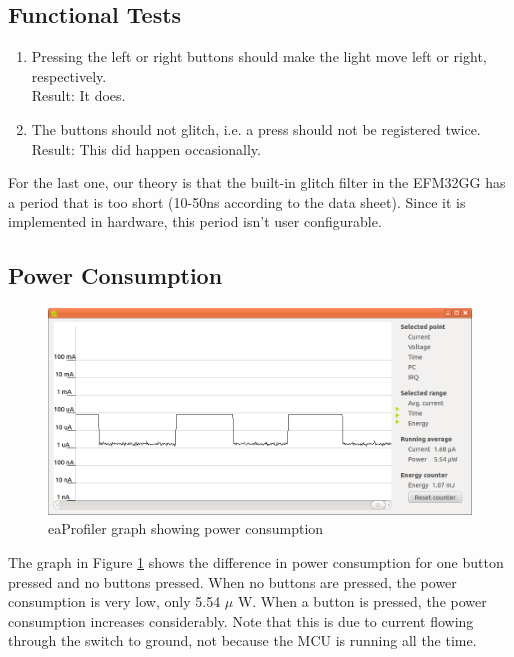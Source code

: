 \documentclass[a4paper, 12pt]{article}
\begin{document}
	\subsection{Functional Tests} %
	\label{sub:functional_tests}
		\begin{enumerate}
			\item Pressing the left or right buttons should make the light move left or right, respectively. \\
				  Result: It does.
			\item The buttons should not glitch, i.e. a press should not be registered twice.\\
				  Result: This did happen occasionally.
		\end{enumerate}
		For the last one, our theory is that the built-in glitch filter in the EFM32GG has a period that is too short (10-50ns according to the data sheet). Since it is implemented in hardware, this period isn't user configurable.

	\subsection{Power Consumption} %
	\label{sub:power_consumption}
		\begin{figure}[!ht]
        \includegraphics[width=\textwidth]{eaprofiler}
        \caption{eaProfiler graph showing power consumption}
        \label{fig:profiler}
        \end{figure}
        The graph in Figure \ref{fig:profiler} shows the difference in power consumption for one button pressed and no buttons pressed. When no buttons are pressed, the power consumption is very low, only 5.54 $\mu$ W. When a button is pressed, the power consumption increases considerably. Note that this is due to current flowing through the switch to ground, not because the MCU is running all the time.
\end{document}
